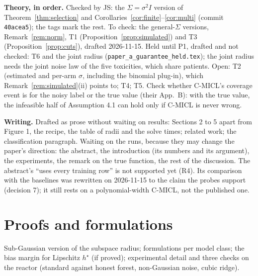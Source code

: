 \begin{tcolorbox}[breakable, colback=blue!3, colframe=blue!40!black,
  title={For JS and DB only; remove before circulating},
  fonttitle=\small\bfseries, left=4pt, right=4pt, top=3pt, bottom=3pt]
\textbf{Theory, in order.} Checked by JS: the $\Sigma = \sigma^2 I$ version of
Theorem~\ref{thm:selection} and Corollaries~\ref{cor:finite}--\ref{cor:multi}
(commit \texttt{40acea5}); the \status{} tags mark the rest. To check: the
general-$\Sigma$ versions, Remark~\ref{rem:norm}, T1
(Proposition~\ref{prop:simulated}) and T3 (Proposition~\ref{prop:cuts}),
drafted 2026-11-15. Held until P1, drafted and not checked: T6 and the joint
radius (\texttt{paper\_a\_guarantee\_held.tex}); the joint radius needs the
joint noise law of the five toxicities, which share patients. Open: T2
(estimated and per-arm $\sigma$, including the binomial plug-in), which
Remark~\ref{rem:simulated}(ii) points to; T4; T5. Check whether C-MICL's
coverage event is for the noisy label or the true value (their App.~B): with
the true value, the infeasible half of Assumption 4.1 can hold only if C-MICL
is never wrong.

\textbf{Writing.} Drafted as prose without waiting on results: Sections 2 to 5
apart from Figure 1, the recipe, the table of radii and the solve times;
related work; the classification paragraph. Waiting on the runs, because they
may change the paper's direction: the abstract, the introduction (its numbers
and its argument), the experiments, the remark on the true function, the rest
of the discussion. The abstract's ``uses every training row'' is not
supported yet (R4). Its comparison with the baselines was rewritten on
2026-11-15 to the claim the probes support (decision 7); it still rests on a
polynomial-width C-MICL, not the published one.
\end{tcolorbox}




\appendix
\section{Proofs and formulations}


\begin{outline}
Sub-Gaussian version of the subspace radius; formulations per model class; the
bias margin for Lipschitz $h^\star$ (if proved); experimental detail and three
checks on the reactor (standard against honest forest, non-Gaussian noise,
cubic ridge).
\end{outline}



